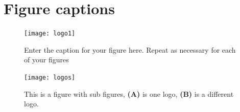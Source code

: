 \documentclass[utf8]{frontiersFPHY} %
\begin{document}
\section*{Figure captions}


\begin{figure}[h!]
\begin{center}
\texttt{[image: logo1]}%
\end{center}
\caption{ Enter the caption for your figure here.  Repeat as  necessary for each of your figures}\label{fig:1}
\end{figure}


\begin{figure}[h!]
\begin{center}
\texttt{[image: logos]}
\end{center}
\caption{This is a figure with sub figures, \textbf{(A)} is one logo, \textbf{(B)} is a different logo.}\label{fig:2}
\end{figure}

\end{document}
